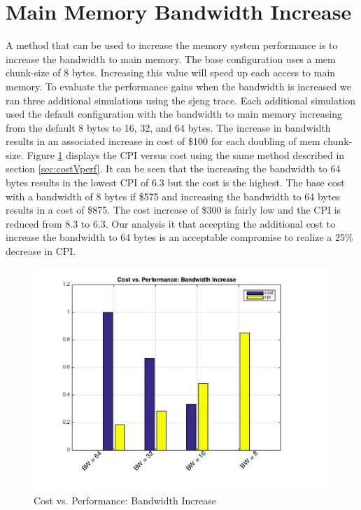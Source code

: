 \documentclass[11pt,titlepage]{article}
\begin{document}
\section{Main Memory Bandwidth Increase}
A method that can be used to increase the memory system performance is to increase the bandwidth to main memory. The base configuration uses a mem chunk-size of 8 bytes. Increasing this value will speed up each access to main memory. To evaluate the performance gains when the bandwidth is increased we ran three additional simulations using the sjeng trace. Each additional simulation used the default configuration with the bandwidth to main memory increasing from the default 8 bytes to 16, 32, and 64 bytes. The increase in bandwidth results in an associated increase in cost of \$100 for each doubling of mem chunk-size. Figure \ref{fig:exSj} displays the CPI versus cost using the same method described in section \ref{sec:costVperf}. It can be seen that the increasing the bandwidth to 64 bytes results in the lowest CPI of 6.3 but the cost is the highest. The base cost with a bandwidth of 8 bytes if \$575 and increasing the bandwidth to 64 bytes results in a cost of \$875. The cost increase of \$300 is fairly low and the CPI is reduced from 8.3 to 6.3. Our analysis it that accepting the additional cost to increase the bandwidth to 64 bytes is an acceptable compromise to realize a 25\% decrease in CPI.
\begin{figure}[H]
  \centering
  \includegraphics[scale=0.75]{extraSjeng}
  \caption{Cost vs. Performance: Bandwidth Increase}
  \label{fig:exSj}
\end{figure}
\end{document}

